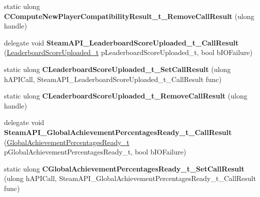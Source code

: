 \begin{DoxyCompactItemize}
static ulong {\bfseries C\+Compute\+New\+Player\+Compatibility\+Result\+\_\+t\+\_\+\+Remove\+Call\+Result} (ulong handle)
\item 
\mbox{\label{class_valve_1_1_interop_1_1_native_entrypoints_ae11af1b5079f8c58af9df62dda913057}} 
delegate void {\bfseries Steam\+A\+P\+I\+\_\+\+Leaderboard\+Score\+Uploaded\+\_\+t\+\_\+\+Call\+Result} (\hyperlink{struct_valve_1_1_steamworks_1_1_leaderboard_score_uploaded__t}{Leaderboard\+Score\+Uploaded\+\_\+t} p\+Leaderboard\+Score\+Uploaded\+\_\+t, bool b\+I\+O\+Failure)
\item 
\mbox{\label{class_valve_1_1_interop_1_1_native_entrypoints_a23650c3b1a4b0c57c19edcc85e8d3bf6}} 
static ulong {\bfseries C\+Leaderboard\+Score\+Uploaded\+\_\+t\+\_\+\+Set\+Call\+Result} (ulong h\+A\+P\+I\+Call, Steam\+A\+P\+I\+\_\+\+Leaderboard\+Score\+Uploaded\+\_\+t\+\_\+\+Call\+Result func)
\item 
\mbox{\label{class_valve_1_1_interop_1_1_native_entrypoints_aceb86c4d2a8ef23c9265799b652681c0}} 
static ulong {\bfseries C\+Leaderboard\+Score\+Uploaded\+\_\+t\+\_\+\+Remove\+Call\+Result} (ulong handle)
\item 
\mbox{\label{class_valve_1_1_interop_1_1_native_entrypoints_ace7965fe428f261236a46dbead68fa84}} 
delegate void {\bfseries Steam\+A\+P\+I\+\_\+\+Global\+Achievement\+Percentages\+Ready\+\_\+t\+\_\+\+Call\+Result} (\hyperlink{struct_valve_1_1_steamworks_1_1_global_achievement_percentages_ready__t}{Global\+Achievement\+Percentages\+Ready\+\_\+t} p\+Global\+Achievement\+Percentages\+Ready\+\_\+t, bool b\+I\+O\+Failure)
\item 
\mbox{\label{class_valve_1_1_interop_1_1_native_entrypoints_a3b994115e413329bca8818f6fee45cb2}} 
static ulong {\bfseries C\+Global\+Achievement\+Percentages\+Ready\+\_\+t\+\_\+\+Set\+Call\+Result} (ulong h\+A\+P\+I\+Call, Steam\+A\+P\+I\+\_\+\+Global\+Achievement\+Percentages\+Ready\+\_\+t\+\_\+\+Call\+Result func)
\item 
\mbox{\label{class_valve_1_1_interop_1_1_native_entrypoints_a122bd9e3c1861d13f9b4d333f9893715}} 

\end{DoxyCompactItemize}

